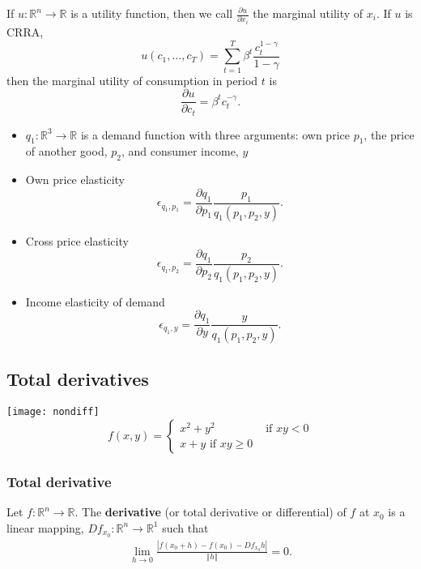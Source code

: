 \documentclass[compress]{beamer}
\def\R{\mathbb{R}}
\newcommand{\norm}[1]{\left\Vert {#1} \right\Vert}
\renewcommand{\to}{{\rightarrow}}
\begin{document}
\begin{frame}
\begin{example}
  If $u:\R^n \to \R$ is a utility function, then we call
  $\frac{\partial u}{\partial x_i}$ the marginal utility of $x_i$.  
  If $u$ is CRRA, 
  \[u(c_1,...,c_T) =
  \sum_{t=1}^T \beta^t \frac{c_t^{1-\gamma}}{1-\gamma} \]
  then  the marginal utility of consumption in period $t$ is 
  \[ \frac{\partial u}{\partial c_t} = \beta^t c_t^{-\gamma}. \]
\end{example}
\end{frame}

\begin{frame}
  \begin{example}
    \begin{itemize}
    \item  $q_1:\R^3 \to \R$ is 
      a demand function with three arguments: own price $p_1$, the price
      of another good, $p_2$, and consumer income, $y$
    \item Own price
      elasticity 
      \[ \epsilon_{q_1,p_1} = \frac{\partial q_1}{\partial p_1}
      \frac{p_1}{q_1(p_1,p_2,y)}. \]
    \item Cross price elasticity 
      \[ \epsilon_{q_1,p_2} = \frac{\partial q_1}{\partial p_2}
      \frac{p_2}{q_1(p_1,p_2,y)}. \]
    \item Income elasticity of demand 
      \[ \epsilon_{q_1,y} = \frac{\partial q_1}{\partial y}
      \frac{y}{q_1(p_1,p_2,y)}. \]
    \end{itemize}
  \end{example}
\end{frame}

\subsection{Total derivatives}

\begin{frame}
  \texttt{[image: nondiff]}
  \[ f(x,y) = \begin{cases} x^2+y^2 & \text{ if } xy < 0 \\
    x + y \text{ if } xy \geq 0 
  \end{cases}
  \]
\end{frame}

\begin{frame}
  \frametitle{Total derivative}
  \begin{definition}
    Let $f: \R^n \to \R$. The \textbf{derivative} (or total derivative
    or differential) of $f$ at $x_0$ is a linear mapping, $Df_{x_0}:
    \R^n \to \R^1$ such that
    \begin{align*}
      \lim_{h \to 0} \frac{\left|f(x_0 + h) - f(x_0) - Df_{x_0} h\right|} {\norm{h}}
      = 0.
    \end{align*}
  \end{definition}
\end{frame}
\end{document}
